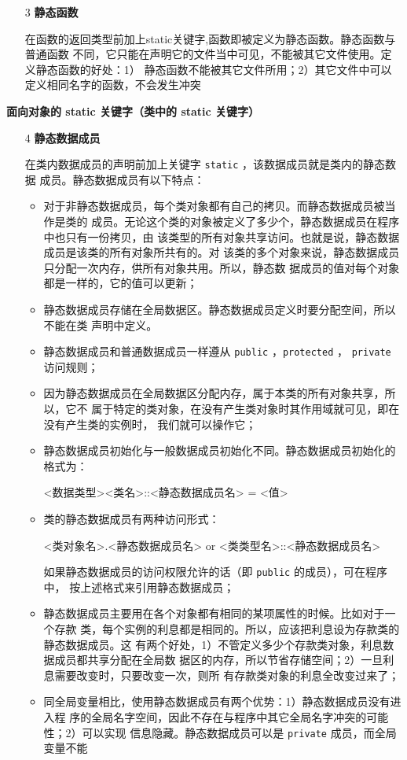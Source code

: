 \begin{itemize}
\item [3] \textbf{静态函数}

  在函数的返回类型前加上static关键字,函数即被定义为静态函数。静态函数与普通函数
  不同，它只能在声明它的文件当中可见，不能被其它文件使用。定义静态函数的好处：1）
  静态函数不能被其它文件所用；2）其它文件中可以定义相同名字的函数，不会发生冲突

\end{itemize}

\noindent\textbf{面向对象的 static 关键字（类中的 static 关键字）}
\begin{itemize}
\item [4] \textbf{静态数据成员}

  在类内数据成员的声明前加上关键字 \verb|static| ，该数据成员就是类内的静态数据
  成员。静态数据成员有以下特点：
  \begin{itemize}
  \item 对于非静态数据成员，每个类对象都有自己的拷贝。而静态数据成员被当作是类的
    成员。无论这个类的对象被定义了多少个，静态数据成员在程序中也只有一份拷贝，由
    该类型的所有对象共享访问。也就是说，静态数据成员是该类的所有对象所共有的。对
    该类的多个对象来说，静态数据成员只分配一次内存，供所有对象共用。所以，静态数
    据成员的值对每个对象都是一样的，它的值可以更新；
  \item 静态数据成员存储在全局数据区。静态数据成员定义时要分配空间，所以不能在类
    声明中定义。
  \item 静态数据成员和普通数据成员一样遵从 \verb|public| ，\verb|protected| ，
    \verb|private| 访问规则；
  \item 因为静态数据成员在全局数据区分配内存，属于本类的所有对象共享，所以，它不
    属于特定的类对象，在没有产生类对象时其作用域就可见，即在没有产生类的实例时，
    我们就可以操作它；
  \item 静态数据成员初始化与一般数据成员初始化不同。静态数据成员初始化的格式为：

    \qquad <数据类型><类名>::<静态数据成员名> = <值>
    
  \item 类的静态数据成员有两种访问形式：

    \qquad <类对象名>.<静态数据成员名> or <类类型名>::<静态数据成员名>

    如果静态数据成员的访问权限允许的话（即 \verb|public| 的成员），可在程序中，
    按上述格式来引用静态数据成员；
    
  \item 静态数据成员主要用在各个对象都有相同的某项属性的时候。比如对于一个存款
    类，每个实例的利息都是相同的。所以，应该把利息设为存款类的静态数据成员。这
    有两个好处，1）不管定义多少个存款类对象，利息数据成员都共享分配在全局数
    据区的内存，所以节省存储空间；2）一旦利息需要改变时，只要改变一次，则所
    有存款类对象的利息全改变过来了；
  \item 同全局变量相比，使用静态数据成员有两个优势：1）静态数据成员没有进入程
    序的全局名字空间，因此不存在与程序中其它全局名字冲突的可能性；2）可以实现
    信息隐藏。静态数据成员可以是 \verb|private| 成员，而全局变量不能
  \end{itemize}
  

\end{itemize}
